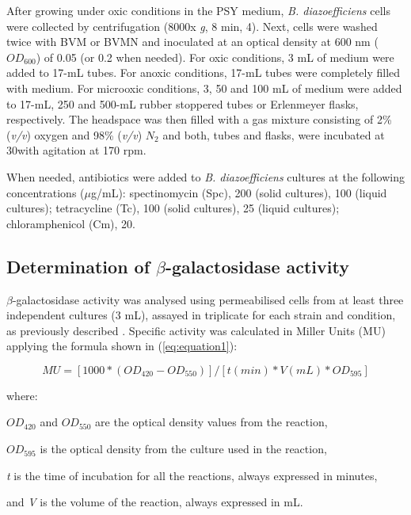 \documentclass[a4paper,11pt]{article}
\begin{document}
After growing under oxic conditions in the PSY medium, {\em B. diazoefficiens} cells were
collected by centrifugation (8000x {\em g}, 8 min, 4\textcelsius). Next, cells were washed twice with BVM
or BVMN and inoculated at an optical density at 600 nm ($OD_{600}$) of 0.05 (or 0.2 when needed). For oxic conditions,
3 mL of medium were added to 17-mL tubes. For anoxic conditions, 17-mL tubes were
completely filled with medium. For microoxic conditions, 3, 50 and 100 mL of medium were added to 17-mL, 250 and 500-mL rubber stoppered tubes or Erlenmeyer flasks, respectively.
The headspace was then filled with a gas mixture consisting of 2\% ({\em v/v}) oxygen and 98\% ({\em v/v})
$N_2$ and both, tubes and flasks, were incubated at 30\textcelsius with agitation at 170 rpm.

When needed, antibiotics were added to {\em B. diazoefficiens} cultures at the following
concentrations ($\mu$g/mL): spectinomycin (Spc), 200 (solid cultures), 100 (liquid cultures); tetracycline (Tc), 100 (solid
cultures), 25 (liquid cultures);
chloramphenicol (Cm), 20.

\subsection{Determination of $\beta$-galactosidase activity}
$\beta$-galactosidase activity was analysed using permeabilised cells from at least three
independent cultures (3 mL), assayed in triplicate for each strain and condition, as previously
described \cite{cabrera2016integrated}. Specific activity was calculated in Miller Units (MU) \cite{miller1972miller} applying the formula shown in (\ref{eq:equation1}):

\begin{equation}
\label{eq:equation1}
MU=[1000*(OD_{420}-OD_{550})]/[t(min)*V(mL)*OD_{595}]
\end{equation}

where:

$OD_{420}$ and $OD_{550}$ are the optical density values from the reaction,

$OD_{595}$ is the optical density from the culture used in the reaction,

{\em t} is the time of incubation for all the reactions, always expressed in minutes,

and {\em V} is the volume of the reaction, always expressed in mL.
\end{document}
